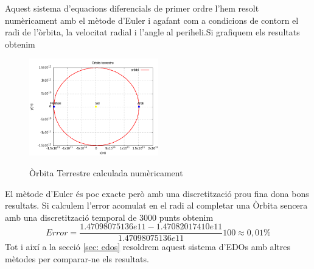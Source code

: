 \documentclass[11pt]{article}
\begin{document}
Aquest sistema d'equacions diferencials de primer ordre l'hem resolt numèricament amb el mètode d'Euler i agafant com a condicions de contorn el radi de l'òrbita, la velocitat radial i l'angle al periheli.\footnotemark[\value{footnote}]
Si grafiquem els resultats obtenim
\begin{figure}[h]
    \centering
    \includegraphics[width=0.5\textwidth]{orbita.png}
    \label{orb_terra}
    \caption{Òrbita Terrestre calculada numèricament}
\end{figure}

El mètode d'Euler és poc exacte però amb una discretització prou fina dona bons resultats. Si calculem l'error acomulat en el radi al completar una Òrbita sencera amb una discretització temporal de $3000$ punts obtenim
\begin{equation}
    Error = \frac{1.47098075136e11-1.47082017410e11}{1.47098075136e11}100\approx0,01\%
\end{equation}
Tot i així a la secció \ref{sec: edos} resoldrem aquest sistema d'EDOs amb altres mètodes per comparar-ne els resultats.
\end{document}
